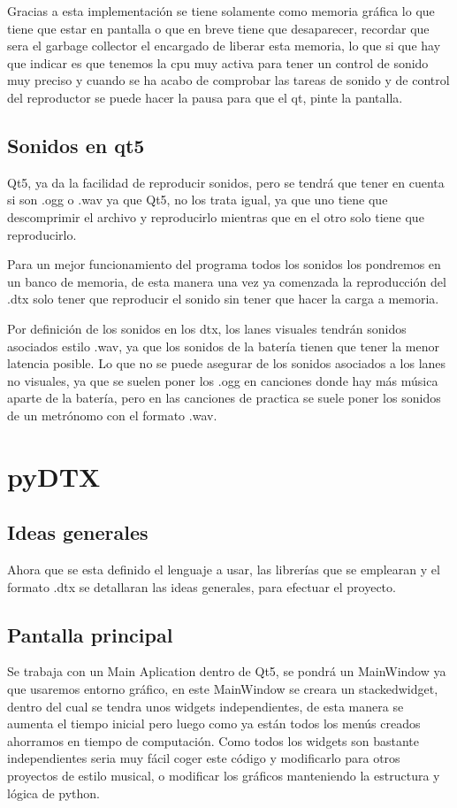 \documentclass[a4paper,11pt,oneside]{book}
\begin{document}
Gracias a esta implementación se tiene solamente como memoria gráfica lo que tiene que estar en pantalla o que en breve tiene que desaparecer, recordar que sera el garbage collector el encargado de liberar esta memoria, lo que si que hay que indicar es que tenemos la cpu muy activa para tener un control de sonido muy preciso y cuando se ha acabo de comprobar las tareas de sonido y de control del reproductor se puede hacer la pausa para que el qt, pinte la pantalla.


\section{Sonidos en qt5}
Qt5, ya da la facilidad de reproducir sonidos, pero se tendrá que tener en cuenta si son .ogg o .wav ya que Qt5, no los trata igual, ya que uno tiene que descomprimir el archivo y reproducirlo mientras que en el otro solo tiene que reproducirlo.

Para un mejor funcionamiento del programa todos los sonidos los pondremos en un banco de memoria, de esta manera una vez ya comenzada la reproducción del .dtx solo tener que reproducir el sonido sin tener que hacer la carga a memoria.

Por definición de los sonidos en los dtx, los lanes visuales tendrán sonidos asociados estilo .wav, ya que los sonidos de la batería tienen que tener la menor latencia posible.
Lo que no se puede asegurar de los sonidos asociados a los lanes no visuales, ya que se suelen poner los .ogg en canciones donde hay más música aparte de la batería, pero en las canciones de practica se suele poner los sonidos de un metrónomo con el formato .wav.

\chapter{pyDTX}
\section{Ideas generales}
Ahora que se esta definido el lenguaje a usar, las librerías que se emplearan y el formato .dtx se detallaran las ideas generales, para efectuar el proyecto.
\section{Pantalla principal}
Se trabaja con un Main Aplication dentro de Qt5, se pondrá un MainWindow ya que usaremos entorno gráfico, en este MainWindow se creara un stackedwidget, dentro del cual se tendra unos widgets independientes, de esta manera se aumenta el tiempo inicial pero luego como ya están todos los menús creados ahorramos en tiempo de computación. Como todos los widgets son bastante independientes seria muy fácil coger este código y modificarlo para otros proyectos de estilo musical, o modificar los gráficos manteniendo la estructura y lógica de python.
\end{document}
